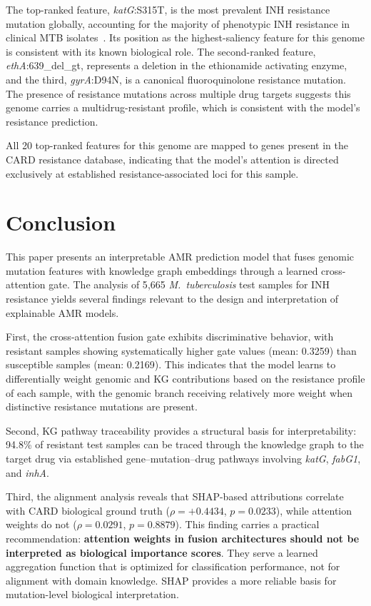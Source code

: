 \documentclass[conference]{IEEEtran}
\begin{document}
The top-ranked feature, \textit{katG}:S315T, is the most prevalent INH resistance mutation globally, accounting for the majority of phenotypic INH resistance in clinical MTB isolates~\cite{ref_katg}. Its position as the highest-saliency feature for this genome is consistent with its known biological role. The second-ranked feature, \textit{ethA}:639\_del\_gt, represents a deletion in the ethionamide activating enzyme, and the third, \textit{gyrA}:D94N, is a canonical fluoroquinolone resistance mutation. The presence of resistance mutations across multiple drug targets suggests this genome carries a multidrug-resistant profile, which is consistent with the model's resistance prediction.

All 20 top-ranked features for this genome are mapped to genes present in the CARD resistance database, indicating that the model's attention is directed exclusively at established resistance-associated loci for this sample.

\section{Conclusion}

This paper presents an interpretable AMR prediction model that fuses genomic mutation features with knowledge graph embeddings through a learned cross-attention gate. The analysis of 5{,}665 \textit{M.\ tuberculosis} test samples for INH resistance yields several findings relevant to the design and interpretation of explainable AMR models.

First, the cross-attention fusion gate exhibits discriminative behavior, with resistant samples showing systematically higher gate values (mean: 0.3259) than susceptible samples (mean: 0.2169). This indicates that the model learns to differentially weight genomic and KG contributions based on the resistance profile of each sample, with the genomic branch receiving relatively more weight when distinctive resistance mutations are present.

Second, KG pathway traceability provides a structural basis for interpretability: 94.8\% of resistant test samples can be traced through the knowledge graph to the target drug via established gene--mutation--drug pathways involving \textit{katG}, \textit{fabG1}, and \textit{inhA}.

Third, the alignment analysis reveals that SHAP-based attributions correlate with CARD biological ground truth ($\rho = +0.4434$, $p = 0.0233$), while attention weights do not ($\rho = 0.0291$, $p = 0.8879$). This finding carries a practical recommendation: \textbf{attention weights in fusion architectures should not be interpreted as biological importance scores}. They serve a learned aggregation function that is optimized for classification performance, not for alignment with domain knowledge. SHAP provides a more reliable basis for mutation-level biological interpretation.
\end{document}
